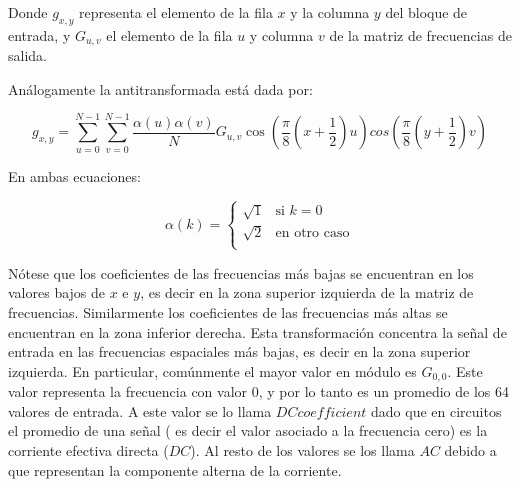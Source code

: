 \documentclass[%
	final,
	reprint,
	notitlepage,
	narroweqnarray,
	inline,
	twoside,
	invited
	]{ieee}
\begin{document}
Donde $g_{x, y}$ representa el elemento de la fila $x$ y la columna $y$ del bloque de entrada, y $G_{u, v}$ 
el elemento de la fila $u$ y columna $v$ de la matriz de frecuencias de salida.

Análogamente la antitransformada está dada por:

\begin{equation}
	g_{x, y} = \sum^{N-1}_{u=0}\sum^{N-1}_{v=0}\frac{\alpha(u)\alpha(v)}{N}G_{u, v}\cos(\frac{\pi}{8}(x+\frac{1}{2})u)cos(\frac{\pi}{8}(y+\frac{1}{2})v)
\end{equation}

En ambas ecuaciones:

\begin{equation}
	\alpha(k) = \left \{
		\begin{array}{rl}
			\sqrt{1} & \mbox{si } k = 0 \\ 
			\sqrt{2} & \mbox{en otro caso} \\
		\end{array}
		\right.
\end{equation}

\par Nótese que los coeficientes de las frecuencias más bajas se encuentran en los valores bajos de $x$ e $y$, 
es decir en la zona superior 
izquierda de la matriz de frecuencias. Similarmente los coeficientes de las frecuencias más altas se encuentran 
en la zona inferior derecha. Esta transformación concentra la señal de entrada en las frecuencias espaciales más bajas, 
es decir en la zona superior izquierda. En particular, comúnmente el mayor valor en módulo es $G_{0,0}$. 
Este valor representa la frecuencia con valor 0, y por lo tanto es un promedio de los 64 valores de entrada. A este 
valor se lo llama $DC coefficient$ dado que en circuitos el promedio de una señal ( es decir el valor asociado 
a la frecuencia cero) es la corriente efectiva directa ($DC$). Al resto de los valores se los llama $AC$ debido 
a que representan la componente alterna de la corriente.
\end{document}
